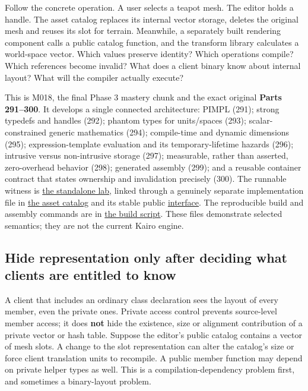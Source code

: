 Follow the concrete operation. A user selects a teapot mesh. The editor holds a handle. The asset catalog replaces its internal vector storage, deletes the original mesh and reuses its slot for terrain. Meanwhile, a separately built rendering component calls a public catalog function, and the transform library calculates a world-space vector. Which values preserve identity? Which operations compile? Which references become invalid? What does a client binary know about internal layout? What will the compiler actually execute?

This is M018, the final Phase 3 mastery chunk and the exact original \textbf{Parts 291--300}. It develops a single connected architecture: PIMPL (291); strong typedefs and handles (292); phantom types for units/spaces (293); scalar-constrained generic mathematics (294); compile-time and dynamic dimensions (295); expression-template evaluation and its temporary-lifetime hazards (296); intrusive versus non-intrusive storage (297); measurable, rather than asserted, zero-overhead behavior (298); generated assembly (299); and a reusable container contract that states ownership and invalidation precisely (300). The runnable witness is \hyperref[source-file-8aedc3fdcd10c91971507448]{the standalone lab}, linked through a genuinely separate implementation file in \hyperref[source-file-04abded74b7e03edc5dcf870]{the asset catalog} and its stable public \hyperref[source-file-0529c78555b675a2ae111228]{interface}. The reproducible build and assembly commands are in \hyperref[source-file-c936569afa19be638ec87991]{the build script}. These files demonstrate selected semantics; they are not the current Kairo engine.

\subsection{Hide representation only after deciding what clients are entitled to know}\label{05-engine-i-ch007-hide-representation-only-after-deciding-what-clients-are-entitled-to-know}

A client that includes an ordinary class declaration sees the layout of every member, even the private ones. Private access control prevents source-level member access; it does \textbf{not} hide the existence, size or alignment contribution of a private vector or hash table. Suppose the editor's public catalog contains a vector of mesh slots. A change to the slot representation can alter the catalog's size or force client translation units to recompile. A public member function may depend on private helper types as well. This is a compilation-dependency problem first, and sometimes a binary-layout problem.

